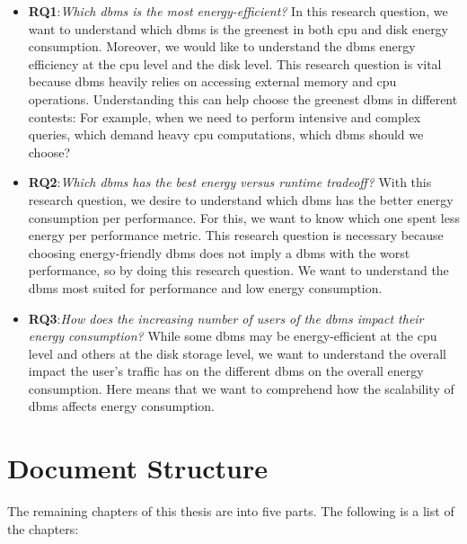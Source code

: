 \begin{itemize}
  \item \textbf{RQ1}:\textit{Which \acrlong{dbms} is the most energy-efficient?}
In this research question, we want to understand which \gls{dbms} is the greenest in both \gls{cpu} and disk energy consumption. Moreover, we would like to understand the \gls{dbms} energy efficiency at the \gls{cpu} level and the disk level. This research question is vital because \gls{dbms} heavily relies on accessing external memory and \gls{cpu} operations. Understanding this can help choose the greenest \gls{dbms} in different contests: For example, when we need to perform intensive and complex queries, which demand heavy \gls{cpu} computations, which \gls{dbms} should we choose?

 \item \textbf{RQ2}:\textit{Which \acrlong{dbms} has the best energy versus runtime tradeoff?}
With this research question, we desire to understand which \gls{dbms} has the better energy consumption per performance. For this, we want to know which one spent less energy per performance metric. This research question is necessary because choosing energy-friendly \gls{dbms} does not imply a \gls{dbms} with the worst performance, so by doing this research question. We want to understand the \gls{dbms} most suited for performance and low energy consumption.
 
 
  \item \textbf{RQ3}:\textit{How does the increasing number of users of the \acrlong{dbms} impact their energy consumption? } While some \gls{dbms} may be energy-efficient at the \gls{cpu} level and others at the disk storage level, we want to understand the overall impact the user's traffic has on the different \gls{dbms} on the overall energy consumption. Here means that we want to comprehend how the scalability of \gls{dbms} affects energy consumption.
\end{itemize}

\section{Document Structure}
\label{sc:structure}

The remaining chapters of this thesis are into five parts. The following is a list of the chapters: 


